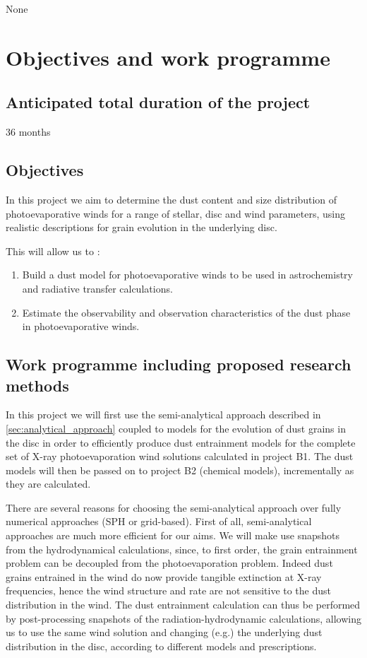 \documentclass[10pt,fleqn,twoside]{article}
\newcommand{\Tcol}{\color{blue}}
\begin{document}
None

\section{\Tcol Objectives and work programme}
\renewcommand{\leftmark}{\sc Objectives and work programme}

\subsection{\Tcol Anticipated total duration of the project}

36 months

\subsection{\Tcol Objectives}
In this project
we aim to determine the dust content and size distribution of photoevaporative winds for a range of stellar, disc and wind parameters,
using realistic descriptions for grain evolution in the underlying
disc. 

This will allow us to : 
\begin{enumerate}
\item Build a dust model for photoevaporative winds to be used in
astrochemistry and radiative transfer calculations.
\item Estimate the observability and observation characteristics of
the dust phase in photoevaporative winds.
\end{enumerate}

\subsection{\Tcol Work programme including proposed research methods}

In this project we will first use the semi-analytical approach described in
\ref{sec:analytical_approach} coupled to models for the
evolution of dust grains in the disc in order to efficiently produce
dust entrainment models for the complete set of X-ray photoevaporation
wind solutions calculated in project B1. The dust models will then be
passed on to project B2 (chemical models), incrementally as they are
calculated. 

There are several reasons for choosing the semi-analytical approach
over fully numerical approaches (SPH or grid-based). First of all,
semi-analytical 
approaches are much more efficient for our aims. We will make
use snapshots from the hydrodynamical calculations, since, to first
order, the grain entrainment problem can be decoupled from the photoevaporation 
problem. Indeed 
dust grains entrained in the wind do now provide tangible extinction
at X-ray frequencies, hence the wind structure and rate are
not sensitive to the dust distribution in the wind. The dust
entrainment calculation can thus be performed by
post-processing snapshots of the radiation-hydrodynamic calculations,
allowing us
to use the same wind solution and changing (e.g.) the underlying dust
distribution in the disc, according to different models and
prescriptions. 
\end{document}
